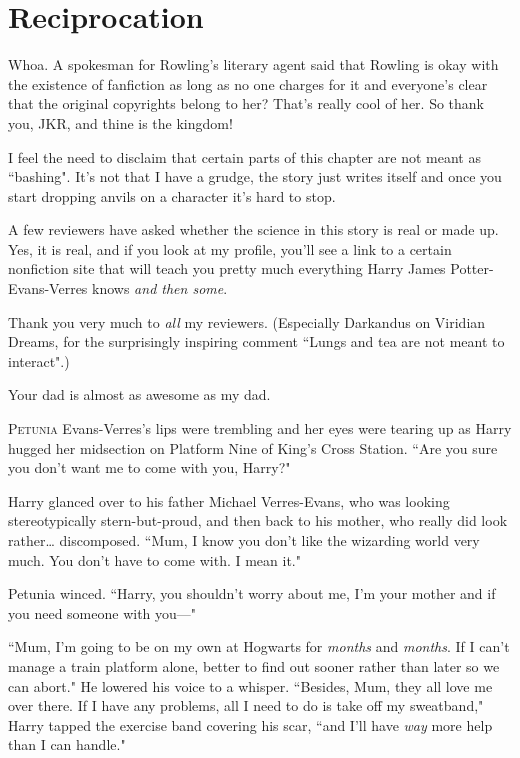 \chapter{Reciprocation}

\begin{chapterOpeningAuthorNote}
Whoa. A spokesman for Rowling's literary agent said that Rowling is okay with the existence of fanfiction as long as no one charges for it and everyone's clear that the original copyrights belong to her? That's really cool of her. So thank you, JKR, and thine is the kingdom!

I feel the need to disclaim that certain parts of this chapter are not meant as ``bashing". It's not that I have a grudge, the story just writes itself and once you start dropping anvils on a character it's hard to stop.

A few reviewers have asked whether the science in this story is real or made up. Yes, it is real, and if you look at my profile, you'll see a link to a certain nonfiction site that will teach you pretty much everything Harry James Potter-Evans-Verres knows \emph{and then some}.

Thank you very much to \emph{all} my reviewers. (Especially Darkandus on Viridian Dreams, for the surprisingly inspiring comment ``Lungs and tea are not meant to interact".)
\end{chapterOpeningAuthorNote}
\begin{chapterOpeningQuote}
Your dad is almost as awesome as my dad.
\end{chapterOpeningQuote}

\lettrine{P}{etunia} Evans-Verres's lips were trembling and her eyes were tearing up as Harry hugged her midsection on Platform Nine of King's Cross Station. ``Are you sure you don't want me to come with you, Harry?"

Harry glanced over to his father Michael Verres-Evans, who was looking stereotypically stern-but-proud, and then back to his mother, who really did look rather{\ldots} discomposed. ``Mum, I know you don't like the wizarding world very much. You don't have to come with. I mean it."

Petunia winced. ``Harry, you shouldn't worry about me, I'm your mother and if you need someone with you—"

``Mum, I'm going to be on my own at Hogwarts for \emph{months} and \emph{months}. If I can't manage a train platform alone, better to find out sooner rather than later so we can abort." He lowered his voice to a whisper. ``Besides, Mum, they all love me over there. If I have any problems, all I need to do is take off my sweatband," Harry tapped the exercise band covering his scar, ``and I'll have \emph{way} more help than I can handle."

